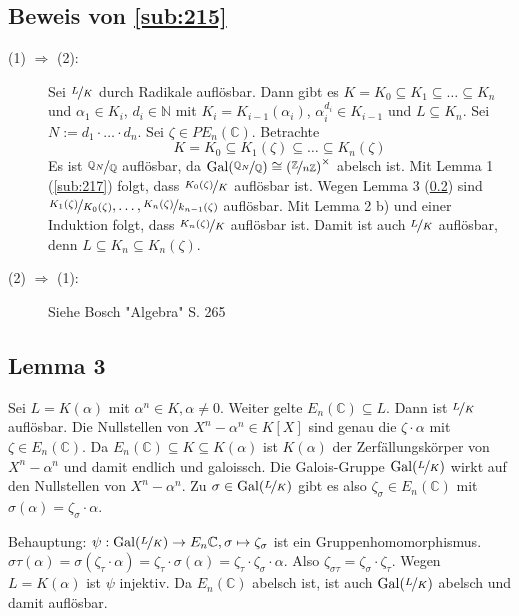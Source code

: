 \subsection{Beweis von \ref{sub:215}} %
\label{sub:219}
\begin{description}
	\item[(1) $\Rightarrow$ (2):] Sei $\nicefrac{L}{K}$ durch Radikale auflösbar. Dann gibt es $K=K_0 \subseteq K_1 \subseteq \ldots \subseteq K_n$ und $\alpha_1 \in K_i$,
	$d_i \in \mathds{N}$ mit $K_i = K_{i-1}(\alpha_i)$, $\alpha_i^{d_i} \in K_{i-1}$ und $L \subseteq K_n$. Sei $N:= d_1 \cdot \ldots \cdot d_n$. Sei 
	$\zeta \in PE_n(\mathds{C})$. Betrachte 
	\[
		K = K_0 \subseteq K_1(\zeta) \subseteq \ldots \subseteq K_n(\zeta)
	\]
	Es ist $\nicefrac{\mathds{Q}_N}{\mathds{Q}}$ auflösbar, da $\Gal(\nicefrac{\mathds{Q}_N}{\mathds{Q}}) \cong \enbrace*{\nicefrac{\mathds{Z}}{n \mathds{Z}}}^\times $
	abelsch ist. Mit Lemma 1 (\ref{sub:217}) folgt, dass $\nicefrac{K_0(\zeta)}{K}$ auflösbar ist. Wegen Lemma 3 (\ref{sub:2110}) sind 
	$\nicefrac{K_1(\zeta)}{K_0(\zeta)}, \ldots , \nicefrac{K_n(\zeta)}{k_{n-1}(\zeta)}$ auflösbar. Mit Lemma 2 b) und einer Induktion folgt, dass
	$\nicefrac{K_n(\zeta)}{K}$ auflösbar ist. Damit ist auch $\nicefrac{L}{K}$ auflösbar, denn $L \subseteq K_n \subseteq K_n(\zeta)$. \bewende
	\item[(2) $\Rightarrow $ (1):] Siehe Bosch "{}Algebra"{} S. 265
\end{description}

\subsection[Lemma 3: Auflösbarkeit einer Radikalerweiterung, die alle Einheitswurzeln enthält]{Lemma 3} %
\label{sub:2110}
Sei $L=K(\alpha)$ mit $\alpha^n \in K, \alpha \not= 0$. Weiter gelte $E_n(\mathds{C}) \subseteq L$. Dann ist $\nicefrac{L}{K}$ auflösbar.
Die Nullstellen von $X^n- \alpha^n \in K[X]$ sind genau die $\zeta \cdot \alpha$ mit $\zeta \in E_n(\mathds{C})$. Da $E_n(\mathds{C}) \subseteq K \subseteq K(\alpha)$ ist
$K(\alpha)$ der Zerfällungskörper von $X^n-\alpha^n$ und damit endlich und galoissch. Die Galois-Gruppe $\Gal(\nicefrac{L}{K})$ wirkt auf den Nullstellen von 
$X^n-\alpha^n$. Zu $\sigma \in \Gal(\nicefrac{L}{K})$ gibt es also $\zeta_\sigma \in E_n(\mathds{C})$ mit $\sigma(\alpha) = \zeta_\sigma \cdot \alpha$.

Behauptung: $\psi : \Gal(\nicefrac{L}{K}) \to E_n{\mathds{C}}, \sigma \mapsto \zeta_\sigma$ ist ein Gruppenhomomorphismus.\\
$\sigma \tau (\alpha) = \sigma( \zeta_\tau \cdot  \alpha) = \zeta_\tau \cdot \sigma(\alpha) = \zeta_\tau \cdot  \zeta_\sigma  \cdot \alpha$. Also $\zeta_{\sigma \tau} = \zeta_\sigma\cdot \zeta_\tau$.
Wegen $L=K(\alpha)$ ist $\psi$ injektiv. Da $E_n(\mathds{C})$ abelsch ist, ist auch $\Gal(\nicefrac{L}{K})$ abelsch und damit auflösbar. \bewende
\newpage

